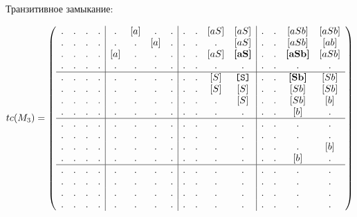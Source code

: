 \begin{example}
Транзитивное замыкание:

\begin{align}
tc(M_3) =
\left(\begin{array}{c c c c | c c c c | c c c c | c c c c } 
. & . & . & .  &  . & [a] & . & .  &  . & . & [aS] & [aS]           &  . & . & [aSb]          & [aSb]  \\
. & . & . & .  &  . & . & [a] & .  &  . & . & .    & [aS]           &  . & . & [aSb]          & [ab]          \\
. & . & . & .  &  [a] & . & . & .  &  . & . & [aS] & \textbf{[aS]}  &  . & . & \textbf{[aSb]} & [aSb]         \\
. & . & . & .  &  . & . & . & .    &  . & . & .    & .              &  . & . & .              & .             \\
\hline
. & . & . & .  &  . & . & . & .    &  . & . & [S] & \texttt{[S]}    &  . & . & \textbf{[Sb]}  & [Sb]    \\
. & . & . & .  &  . & . & . & .    &  . & . & [S] & [S]             &  . & . & [Sb] & [Sb]    \\
. & . & . & .  &  . & . & . & .    &  . & . & .   & [S]             &  . & . & [Sb] & [b]  \\
. & . & . & .  &  . & . & . & .    &  . & . & .   & .               &  . & . & [b]  & .    \\
\hline                                                              
. & . & . & .  &  . & . & . & .    &  . & . & . & .               &  . & . & .    & .   \\
. & . & . & .  &  . & . & . & .    &  . & . & . & .               &  . & . & .    & .   \\
. & . & . & .  &  . & . & . & .    &  . & . & . & .               &  . & . & .    & [b] \\
. & . & . & .  &  . & . & . & .    &  . & . & . & .               &  . & . & [b]  & . \\
\hline                                                              
. & . & . & .  &  . & . & . & .    &  . & . & . & .               &  . & . & . & .   \\
. & . & . & .  &  . & . & . & .    &  . & . & . & .               &  . & . & . & .   \\
. & . & . & .  &  . & . & . & .    &  . & . & . & .               &  . & . & . & .   \\
. & . & . & .  &  . & . & . & .    &  . & . & . & .               &  . & . & . & . 
\end{array}\right)
\end{align}


\end{example}

